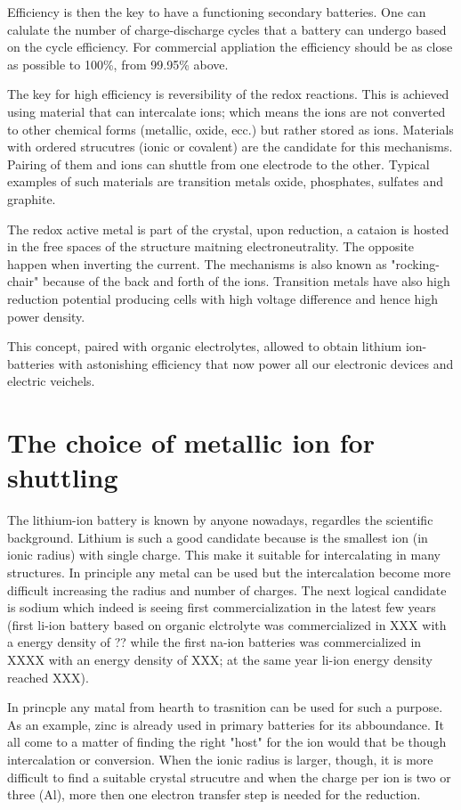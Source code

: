 Efficiency is then the key to have a functioning secondary batteries. One can calulate the number of charge-discharge cycles that a battery can undergo based on the cycle efficiency. For commercial appliation the efficiency should be as close as possible to 100\%, from 99.95\% above.

The key for high efficiency is reversibility of the redox reactions. This is achieved using material that can intercalate ions; which means the ions are not converted to other chemical forms (metallic, oxide, ecc.) but rather stored as ions. Materials with ordered strucutres (ionic or covalent) are the candidate for this mechanisms. Pairing of them and ions can shuttle from one electrode to the other. Typical examples of such materials are transition metals oxide, phosphates, sulfates and graphite.

The redox active metal is part of the crystal, upon reduction, a cataion is hosted in the free spaces of the structure maitning electroneutrality. The opposite happen when inverting the current. The mechanisms is also known as "rocking-chair" because of the back and forth of the ions. Transition metals have also high reduction potential producing cells with high voltage difference and hence high power density.

This concept, paired with organic electrolytes, allowed to obtain lithium ion-batteries with astonishing efficiency that now power all our electronic devices and electric veichels.

\section{The choice of metallic ion for shuttling}

The lithium-ion battery is known by anyone nowadays, regardles the scientific background. Lithium is such a good candidate because is the smallest ion (in ionic radius) with single charge. This make it suitable for intercalating in many structures. In principle any metal can be used but the intercalation become more difficult increasing the radius and number of charges. The next logical candidate is sodium which indeed is seeing first commercialization in the latest few years (first li-ion battery based on organic elctrolyte was commercialized in XXX with a energy density of ?? while the first na-ion batteries was commercialized in XXXX with an energy density of XXX; at the same year li-ion energy density reached XXX). 

In princple any matal from hearth to trasnition can be used for such a purpose. As an example, zinc is already used in primary batteries for its abboundance. It all come to a matter of finding the right "host" for the ion would that be though intercalation or conversion. When the ionic radius is larger, though, it is more difficult to find a suitable crystal strucutre and when the charge per ion is two or three (Al), more then one electron transfer step is needed for the reduction. 

